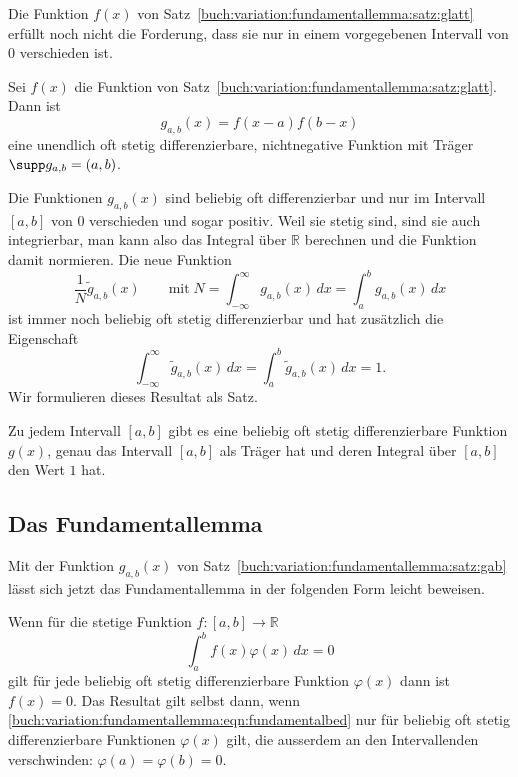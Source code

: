 Die Funktion $f(x)$ von 
Satz~\ref{buch:variation:fundamentallemma:satz:glatt} 
erfüllt noch nicht die Forderung, dass sie nur in einem vorgegebenen
Intervall von $0$ verschieden ist.



\begin{satz}
\label{buch:variation:fundamentallemma:satz:gab}
Sei $f(x)$ die Funktion von
Satz~\ref{buch:variation:fundamentallemma:satz:glatt}.
Dann ist
\[
g_{a,b}(x)
=
f(x-a) f(b-x)
\]
eine unendlich oft stetig differenzierbare, nichtnegative Funktion mit Träger
$\supp g_{a,b}=(a,b)$.
\end{satz}

Die Funktionen $g_{a,b}(x)$ sind beliebig oft differenzierbar und nur im
Intervall $[a,b]$ von $0$ verschieden und sogar positiv.
Weil sie stetig sind, sind sie auch integrierbar, man kann also das
Integral über $\mathbb{R}$ berechnen und die Funktion damit normieren.
Die neue Funktion
\[
\frac{1}{N}
\tilde{g}_{a,b}(x)
\qquad\text{mit}\;
N
=
\int_{-\infty}^{\infty}g_{a,b}(x)\,dx
=
\int_a^b g_{a,b}(x)\,dx
\]
ist immer noch beliebig oft stetig differenzierbar und hat zusätzlich die
Eigenschaft
\[
\int_{-\infty}^{\infty}
\tilde{g}_{a,b}(x)\,dx
=
\int_a^b
\tilde{g}_{a,b}(x)\,dx
=
1.
\]
Wir formulieren dieses Resultat als Satz.

\begin{satz}
\label{buch:variation:satz:gabeins}
Zu jedem Intervall $[a,b]$ gibt es eine beliebig oft stetig
differenzierbare Funktion $g(x)$, genau das Intervall $[a,b]$
als Träger hat und deren Integral über $[a,b]$ den Wert $1$ hat.
\end{satz}

%
%
\subsection{Das Fundamentallemma}
Mit der Funktion $g_{a,b}(x)$ von
Satz~\ref{buch:variation:fundamentallemma:satz:gab}
lässt sich jetzt das Fundamentallemma in der folgenden Form
leicht beweisen.

\begin{satz}[Fundamentallemma]
Wenn für die stetige Funktion $f\colon[a,b]\to\mathbb{R}$ 
\begin{equation}
\int_a^b f(x)\varphi(x)\,dx = 0
\label{buch:variation:fundamentallemma:eqn:fundamentalbed}
\end{equation}
gilt für jede beliebig oft stetig differenzierbare Funktion $\varphi(x)$ 
dann ist $f(x)=0$.
Das Resultat gilt selbst dann, wenn
\eqref{buch:variation:fundamentallemma:eqn:fundamentalbed}
nur für beliebig oft stetig differenzierbare Funktionen $\varphi(x)$ 
gilt, die ausserdem an den Intervallenden verschwinden:
$\varphi(a)=\varphi(b)=0$.
\end{satz}


